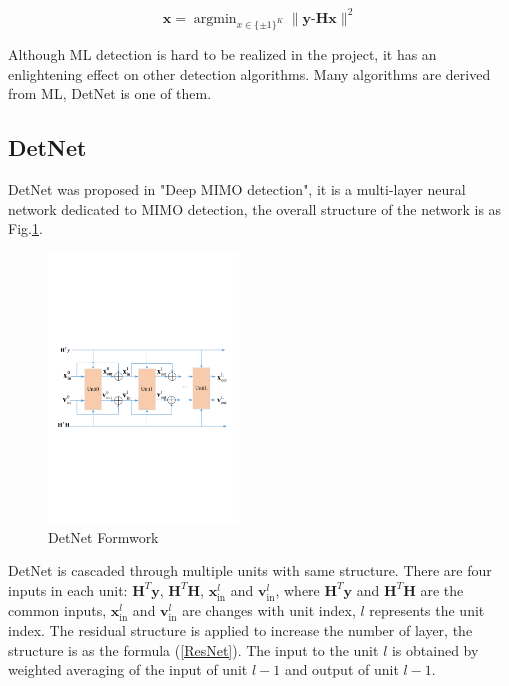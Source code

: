\documentclass[conference]{IEEEtran}
\begin{document}
\begin{equation}
\label{ML}
\hat{\textbf{x}}=\mathop{\arg\min}_{x\in\{\pm1\}^K}\|\textbf{y-Hx}\|^2
\end{equation}

Although ML detection is hard to be realized in the project, it has an enlightening effect on other detection algorithms. Many  algorithms are derived from ML, DetNet is one of them.

\subsection{DetNet}
DetNet was proposed in "Deep MIMO detection", it is a multi-layer neural network dedicated to MIMO detection, the overall structure of the network is as Fig.\ref{Network model}.

\begin{figure}[ht]
  \centering
  \includegraphics[width=0.45\textwidth]{DetNetFormWork.pdf}
  \caption{DetNet Formwork}
  \label{Network model}
\end{figure}

DetNet is cascaded through multiple units with same structure. There are four inputs in each unit: ${\textbf{H}^T\textbf{y}}$, ${\textbf{H}^T\textbf{H}}$, ${\textbf{x}_{\textrm{in}}^l}$ and ${\textbf{v}_{\textrm{in}}^l}$, where ${\textbf{H}^T\textbf{y}}$ and ${\textbf{H}^T\textbf{H}}$ are the common inputs, ${\textbf{x}_{\textrm{in}}^l}$ and ${\textbf{v}_{\textrm{in}}^l}$ are changes with unit index, $l$ represents the unit index. The residual structure is applied to increase the number of layer, the structure is as the formula (\ref{ResNet}). The input to the unit $l$ is obtained by weighted averaging of the input of unit $l-1$ and output of unit $l-1$.
\end{document}
